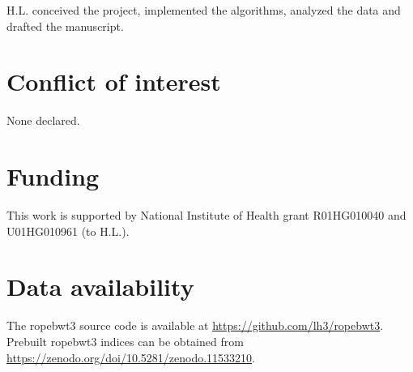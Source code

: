 \documentclass[webpdf,contemporary,large,namedate]{oup-authoring-template}%
\begin{document}
H.L. conceived the project, implemented the algorithms, analyzed the data and drafted the manuscript.

\section*{Conflict of interest}

None declared.

\section*{Funding}

This work is supported by National Institute of Health grant R01HG010040 and U01HG010961 (to H.L.).

\section*{Data availability}

The ropebwt3 source code is available at \url{https://github.com/lh3/ropebwt3}.
Prebuilt ropebwt3 indices can be obtained from \url{https://zenodo.org/doi/10.5281/zenodo.11533210}.


{\sffamily\small
}
\end{document}
